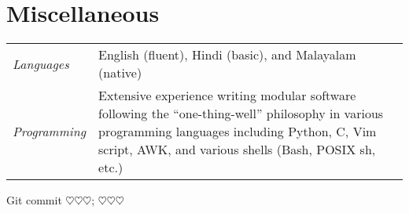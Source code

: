 \documentclass[10pt]{article}
\def\gitError{$\heartsuit\heartsuit\heartsuit$}
\def\gitHash{\gitError}
\def\gitShortHash{\gitError}
\def\gitCommitterDate{\gitError}
\begin{document}


\section*{Miscellaneous}

\begin{tabular}{@{}p{1in}p{5in}}
  \emph{Languages}   & English (fluent), Hindi (basic), and Malayalam (native)\\
  \emph{Programming} & Extensive experience writing modular software following the ``one-thing-well'' philosophy in various programming languages including Python, C, Vim script, AWK, and various shells (Bash, POSIX sh, etc.)
\end{tabular}


\bigskip

\begin{center}
  \hypersetup{hidelinks}\color{gray}
  Git commit \href{https://github.com/manu-mannattil/vitae/tree/\gitHash}{\texttt{\gitShortHash}}; \gitCommitterDate
\end{center}
\end{document}
